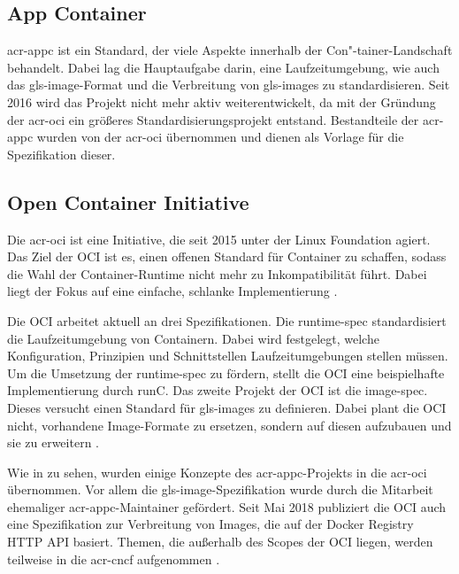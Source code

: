 \subsection{App Container}
\label{sec:appc}
\Gls{acr-appc} ist ein Standard, der viele Aspekte innerhalb der Con"-tainer-Landschaft behandelt. Dabei lag die Hauptaufgabe darin, eine Laufzeitumgebung, wie auch das \gls{gls-image}-Format und die Verbreitung von \glspl{gls-image} zu standardisieren. Seit 2016 wird das Projekt nicht mehr aktiv weiterentwickelt, da mit der Gründung der \gls{acr-oci} ein größeres Standardisierungsprojekt entstand. Bestandteile der \gls{acr-appc} wurden von der \gls{acr-oci} übernommen und dienen als Vorlage für die Spezifikation dieser.

\subsection{Open Container Initiative}
\label{sec:oci}
Die \gls{acr-oci} ist eine Initiative, die seit 2015 unter der Linux Foundation agiert. Das Ziel der OCI ist es, einen offenen Standard für Container zu schaffen, sodass die Wahl der Container-Runtime nicht mehr zu Inkompatibilität führt. Dabei liegt der Fokus auf eine einfache, schlanke Implementierung \citep{OpenContainerInitiative}. 

Die OCI arbeitet aktuell an drei Spezifikationen. Die runtime-spec standardisiert die Laufzeitumgebung  von Containern. Dabei wird festgelegt, welche Konfiguration, Prinzipien und Schnittstellen Laufzeitumgebungen stellen müssen. Um die Umsetzung der runtime-spec zu fördern, stellt die OCI eine beispielhafte Implementierung durch runC. Das zweite Projekt der OCI ist die image-spec. Dieses versucht einen Standard für \glspl{gls-image} zu definieren. Dabei plant die OCI nicht, vorhandene Image-Formate zu ersetzen, sondern auf diesen aufzubauen und sie zu erweitern \citep{OpenContainerInitiative}.

Wie in  zu sehen, wurden einige Konzepte des \gls{acr-appc}-Projekts in die \gls{acr-oci} übernommen. Vor allem die \gls{gls-image}-Spezifikation wurde durch die Mitarbeit ehemaliger \gls{acr-appc}-Maintainer gefördert. Seit Mai 2018 publiziert die OCI auch eine Spezifikation zur Verbreitung von Images, die auf der Docker Registry HTTP API basiert. Themen, die außerhalb des Scopes der OCI liegen, werden teilweise in die \gls{acr-cncf} aufgenommen \citep{MakingSenseofContainerStandardsandFoundations:OCICNCFAppcandRkt}.

